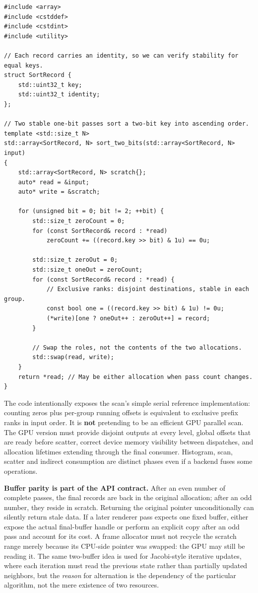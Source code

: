 \begin{verbatim}
#include <array>
#include <cstddef>
#include <cstdint>
#include <utility>

// Each record carries an identity, so we can verify stability for equal keys.
struct SortRecord {
    std::uint32_t key;
    std::uint32_t identity;
};

// Two stable one-bit passes sort a two-bit key into ascending order.
template <std::size_t N>
std::array<SortRecord, N> sort_two_bits(std::array<SortRecord, N> input)
{
    std::array<SortRecord, N> scratch{};
    auto* read = &input;
    auto* write = &scratch;

    for (unsigned bit = 0; bit != 2; ++bit) {
        std::size_t zeroCount = 0;
        for (const SortRecord& record : *read)
            zeroCount += ((record.key >> bit) & 1u) == 0u;

        std::size_t zeroOut = 0;
        std::size_t oneOut = zeroCount;
        for (const SortRecord& record : *read) {
            // Exclusive ranks: disjoint destinations, stable in each group.
            const bool one = ((record.key >> bit) & 1u) != 0u;
            (*write)[one ? oneOut++ : zeroOut++] = record;
        }

        // Swap the roles, not the contents of the two allocations.
        std::swap(read, write);
    }
    return *read; // May be either allocation when pass count changes.
}
\end{verbatim}

The code intentionally exposes the scan's simple serial reference implementation: counting zeros plus per-group running offsets is equivalent to exclusive prefix ranks in input order. It is \textbf{not} pretending to be an efficient GPU parallel scan. The GPU version must provide disjoint outputs at every level, global offsets that are ready before scatter, correct device memory visibility between dispatches, and allocation lifetimes extending through the final consumer. Histogram, scan, scatter and indirect consumption are distinct phases even if a backend fuses some operations.

\textbf{Buffer parity is part of the API contract.} After an even number of complete passes, the final records are back in the original allocation; after an odd number, they reside in scratch. Returning the original pointer unconditionally can silently return stale data. If a later renderer pass expects one fixed buffer, either expose the actual final-buffer handle or perform an explicit copy after an odd pass and account for its cost. A frame allocator must not recycle the scratch range merely because its CPU-side pointer was swapped: the GPU may still be reading it. The same two-buffer idea is used for Jacobi-style iterative updates, where each iteration must read the previous state rather than partially updated neighbors, but the \emph{reason} for alternation is the dependency of the particular algorithm, not the mere existence of two resources.

